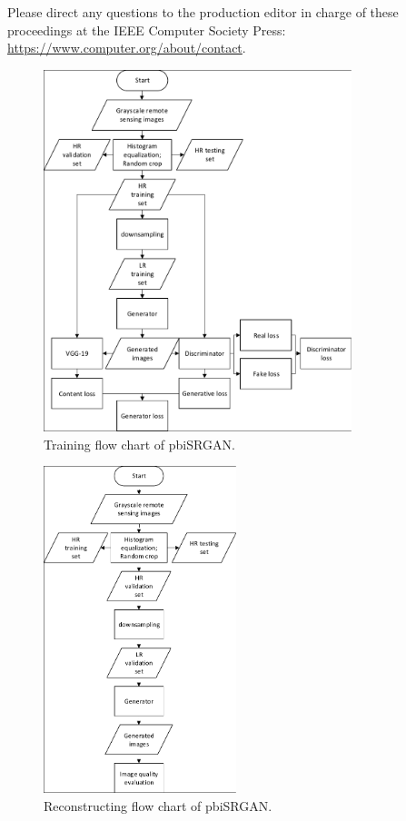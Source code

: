 \documentclass[10pt,twocolumn,letterpaper]{article}
\begin{document}
Please direct any questions to the production editor in charge of these 
proceedings at the IEEE Computer Society Press: 
\url{https://www.computer.org/about/contact}. 


{\small


}



\begin{figure}
\begin{center}
\includegraphics[width=0.8\textwidth]{fig1}
\end{center}
   \caption{Training flow chart of pbiSRGAN.}
\label{fig1}
\end{figure}

 \begin{figure}
\begin{center}
\includegraphics[width=0.5\textwidth]{fig2}
\end{center}
   \caption{Reconstructing flow chart of pbiSRGAN.}
\label{fig2}
\end{figure}
\end{document}
